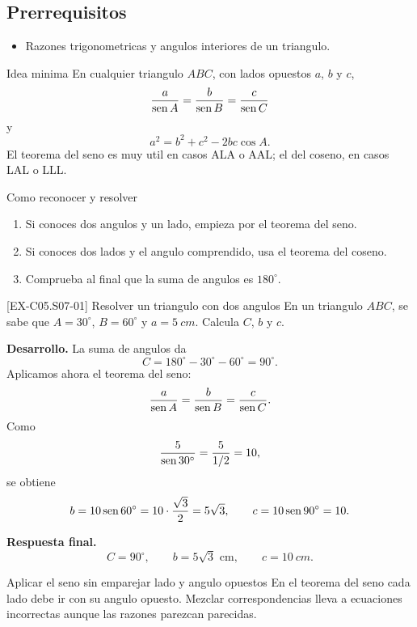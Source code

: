 \subsection*{Prerrequisitos}
\begin{itemize}
  \item Razones trigonometricas y angulos interiores de un triangulo.
\end{itemize}

\begin{theorybox}{Idea minima}
En cualquier triangulo \(ABC\), con lados opuestos \(a\), \(b\) y \(c\),
\[
\frac{a}{\operatorname{sen} A}=\frac{b}{\operatorname{sen} B}=\frac{c}{\operatorname{sen} C}
\]
y
\[
a^2=b^2+c^2-2bc\cos A.
\]
El teorema del seno es muy util en casos ALA o AAL; el del coseno, en casos LAL o LLL.
\end{theorybox}

\begin{methodbox}{Como reconocer y resolver}
\begin{enumerate}
  \item Si conoces dos angulos y un lado, empieza por el teorema del seno.
  \item Si conoces dos lados y el angulo comprendido, usa el teorema del coseno.
  \item Comprueba al final que la suma de angulos es \(180^\circ\).
\end{enumerate}
\end{methodbox}

\begin{solvedexample}{[EX-C05.S07-01] Resolver un triangulo con dos angulos}
En un triangulo \(ABC\), se sabe que \(A=30^\circ\), \(B=60^\circ\) y \(a=\SI{5}{cm}\).
Calcula \(C\), \(b\) y \(c\).

\textbf{Desarrollo.} La suma de angulos da
\[
C=180^\circ-30^\circ-60^\circ=90^\circ.
\]
Aplicamos ahora el teorema del seno:
\[
\frac{a}{\operatorname{sen} A}=\frac{b}{\operatorname{sen} B}=\frac{c}{\operatorname{sen} C}.
\]
Como
\[
\frac{5}{\operatorname{sen} 30^\circ}=\frac{5}{1/2}=10,
\]
se obtiene
\[
b=10\operatorname{sen} 60^\circ=10\cdot \frac{\sqrt{3}}{2}=5\sqrt{3},
\qquad
c=10\operatorname{sen} 90^\circ=10.
\]

\textbf{Respuesta final.}
\[
C=90^\circ,
\qquad
b=5\sqrt{3}\text{ cm},
\qquad
c=\SI{10}{cm}.
\]
\end{solvedexample}

\begin{commonerror}{Aplicar el seno sin emparejar lado y angulo opuestos}
En el teorema del seno cada lado debe ir con su angulo opuesto. Mezclar correspondencias lleva
a ecuaciones incorrectas aunque las razones parezcan parecidas.
\end{commonerror}

